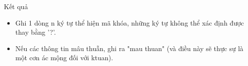 Kết quả
\begin{itemize}
	\item Ghi 1 dòng n ký tự thể hiện mã khóa, những ký tự không thể xác định được thay bằng '?'.
	\item Nếu các thông tin mâu thuẫn, ghi ra "mau thuan" (và điều này sẽ thực sự là một cơn ác mộng đối với ktuan).
\end{itemize}